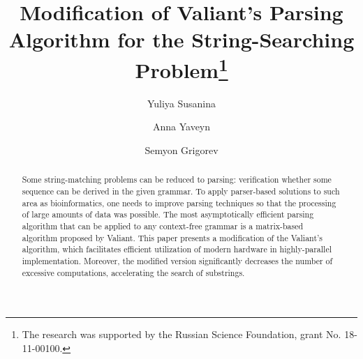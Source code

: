 \documentclass[runningheads]{llncs}
\begin{document}
%
\title{Modification of Valiant's Parsing Algorithm for the String-Searching Problem\thanks{The research was supported by the Russian Science Foundation, grant No. 18-11-00100.}}
%
%
\author{Yuliya Susanina \Letter \and
Anna Yaveyn \and
Semyon Grigorev}
%
%
%
\maketitle              %
%
\begin{abstract}
Some string-matching problems can be reduced to parsing: verification whether some sequence can be derived in the given grammar. 
To apply parser-based solutions to such area as bioinformatics, one needs to improve parsing techniques so that the processing of large amounts of data was possible.
The most asymptotically efficient parsing algorithm that can be applied to any context-free grammar is a matrix-based algorithm proposed by Valiant.
This paper presents a modification of the Valiant’s algorithm, which facilitates efficient utilization of modern hardware in highly-parallel implementation. 
Moreover, the modified version significantly decreases the number of excessive computations, accelerating the search of substrings.

\end{abstract}
%
%
%







%


\end{document}
